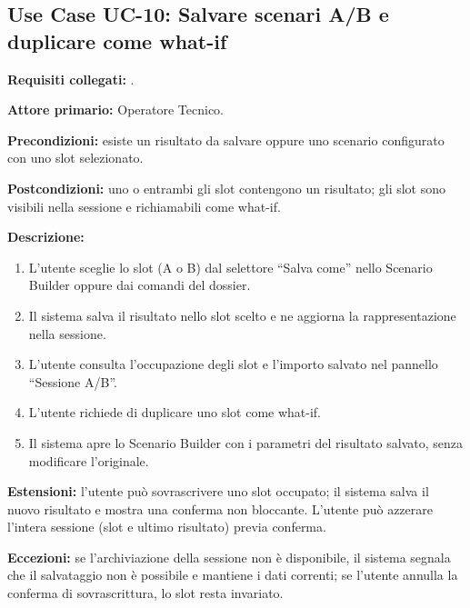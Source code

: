 \subsection*{Use Case UC-10: Salvare scenari A/B e duplicare come what-if}
\textbf{Requisiti collegati:} .\par
\textbf{Attore primario:} Operatore Tecnico.\par
\textbf{Precondizioni:} esiste un risultato da salvare oppure uno scenario configurato con uno slot selezionato.\par
\textbf{Postcondizioni:} uno o entrambi gli slot contengono un risultato; gli slot sono visibili nella sessione e richiamabili come what-if.\par
\textbf{Descrizione:}
\begin{enumerate}[leftmargin=1.6em, itemsep=0.1em]
    \item L'utente sceglie lo slot (A o B) dal selettore ``Salva come'' nello Scenario Builder oppure dai comandi del dossier.
    \item Il sistema salva il risultato nello slot scelto e ne aggiorna la rappresentazione nella sessione.
    \item L'utente consulta l'occupazione degli slot e l'importo salvato nel pannello ``Sessione A/B''.
    \item L'utente richiede di duplicare uno slot come what-if.
    \item Il sistema apre lo Scenario Builder con i parametri del risultato salvato, senza modificare l'originale.
\end{enumerate}
\textbf{Estensioni:} l'utente può sovrascrivere uno slot occupato; il sistema salva il nuovo risultato e mostra una conferma non bloccante. L'utente può azzerare l'intera sessione (slot e ultimo risultato) previa conferma.\par
\textbf{Eccezioni:} se l'archiviazione della sessione non è disponibile, il sistema segnala che il salvataggio non è possibile e mantiene i dati correnti; se l'utente annulla la conferma di sovrascrittura, lo slot resta invariato.

